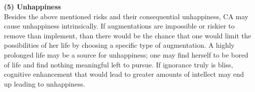 \textbf{(5) Unhappiness} \\
Besides the above mentioned risks and their consequential unhappiness, CA may cause unhappiness intrinsically. If augmentations are impossible or riskier to remove than implement, than there would be the chance that one would limit the possibilities of her life by choosing a specific type of augmentation. A highly prolonged life may be a source for unhappiness; one may find herself to be bored of life and find nothing meaningful left to pursue. If ignorance truly is bliss, cognitive enhancement that would lead to greater amounts of intellect may end up leading to unhappiness.




%
%
%	
%
%
